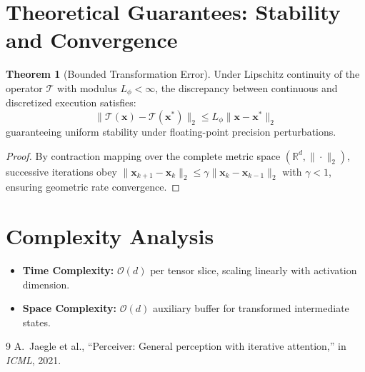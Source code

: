 \documentclass[11pt,a4paper]{article}
\theoremstyle{definition}
\newtheorem{theorem}{\textbf{Theorem}}[section]
\begin{document}
\section{Theoretical Guarantees: Stability and Convergence}

\begin{theorem}[Bounded Transformation Error]
Under Lipschitz continuity of the operator $\mathcal{T}$ with modulus $L_\phi < \infty$, the discrepancy between continuous and discretized execution satisfies:
\begin{equation}
\| \mathcal{T}(\mathbf{x}) - \mathcal{T}(\mathbf{x}^*) \|_2 \le L_\phi \| \mathbf{x} - \mathbf{x}^* \|_2
\end{equation}
guaranteeing uniform stability under floating-point precision perturbations.
\end{theorem}

\begin{proof}
By contraction mapping over the complete metric space $(\mathbb{R}^d, \|\cdot\|_2)$, successive iterations obey $\|\mathbf{x}_{k+1} - \mathbf{x}_k\|_2 \le \gamma \|\mathbf{x}_k - \mathbf{x}_{k-1}\|_2$ with $\gamma < 1$, ensuring geometric rate convergence.
\end{proof}

\section{Complexity Analysis}

\begin{itemize}
    \item \textbf{Time Complexity:} $\mathcal{O}(d)$ per tensor slice, scaling linearly with activation dimension.
    \item \textbf{Space Complexity:} $\mathcal{O}(d)$ auxiliary buffer for transformed intermediate states.
\end{itemize}

\begin{thebibliography}{9}
 A.~Jaegle et al., ``Perceiver: General perception with iterative attention,'' in \emph{ICML}, 2021.
\end{thebibliography}
\end{document}

